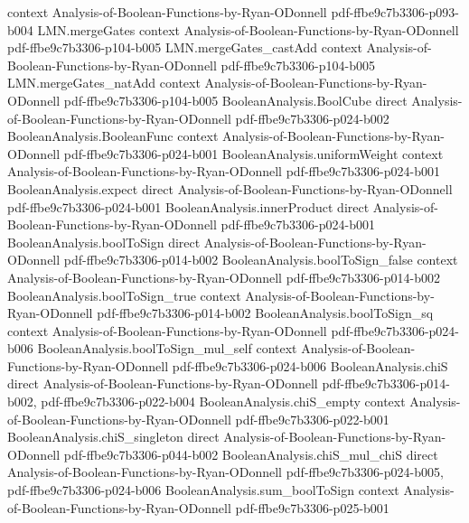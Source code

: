 \begin{lemma}
  {context}
  {Analysis-of-Boolean-Functions-by-Ryan-ODonnell}
  {pdf-ffbe9c7b3306-p093-b004}
\proofstep
  {LMN.mergeGates}
  {context}
  {Analysis-of-Boolean-Functions-by-Ryan-ODonnell}
  {pdf-ffbe9c7b3306-p104-b005}
\proofstep
  {LMN.mergeGates_castAdd}
  {context}
  {Analysis-of-Boolean-Functions-by-Ryan-ODonnell}
  {pdf-ffbe9c7b3306-p104-b005}
\proofstep
  {LMN.mergeGates_natAdd}
  {context}
  {Analysis-of-Boolean-Functions-by-Ryan-ODonnell}
  {pdf-ffbe9c7b3306-p104-b005}
\proofstep
  {BooleanAnalysis.BoolCube}
  {direct}
  {Analysis-of-Boolean-Functions-by-Ryan-ODonnell}
  {pdf-ffbe9c7b3306-p024-b002}
\proofstep
  {BooleanAnalysis.BooleanFunc}
  {context}
  {Analysis-of-Boolean-Functions-by-Ryan-ODonnell}
  {pdf-ffbe9c7b3306-p024-b001}
\proofstep
  {BooleanAnalysis.uniformWeight}
  {context}
  {Analysis-of-Boolean-Functions-by-Ryan-ODonnell}
  {pdf-ffbe9c7b3306-p024-b001}
\proofstep
  {BooleanAnalysis.expect}
  {direct}
  {Analysis-of-Boolean-Functions-by-Ryan-ODonnell}
  {pdf-ffbe9c7b3306-p024-b001}
\proofstep
  {BooleanAnalysis.innerProduct}
  {direct}
  {Analysis-of-Boolean-Functions-by-Ryan-ODonnell}
  {pdf-ffbe9c7b3306-p024-b001}
\proofstep
  {BooleanAnalysis.boolToSign}
  {direct}
  {Analysis-of-Boolean-Functions-by-Ryan-ODonnell}
  {pdf-ffbe9c7b3306-p014-b002}
\proofstep
  {BooleanAnalysis.boolToSign_false}
  {context}
  {Analysis-of-Boolean-Functions-by-Ryan-ODonnell}
  {pdf-ffbe9c7b3306-p014-b002}
\proofstep
  {BooleanAnalysis.boolToSign_true}
  {context}
  {Analysis-of-Boolean-Functions-by-Ryan-ODonnell}
  {pdf-ffbe9c7b3306-p014-b002}
\proofstep
  {BooleanAnalysis.boolToSign_sq}
  {context}
  {Analysis-of-Boolean-Functions-by-Ryan-ODonnell}
  {pdf-ffbe9c7b3306-p024-b006}
\proofstep
  {BooleanAnalysis.boolToSign_mul_self}
  {context}
  {Analysis-of-Boolean-Functions-by-Ryan-ODonnell}
  {pdf-ffbe9c7b3306-p024-b006}
\proofstep
  {BooleanAnalysis.chiS}
  {direct}
  {Analysis-of-Boolean-Functions-by-Ryan-ODonnell}
  {pdf-ffbe9c7b3306-p014-b002,
    pdf-ffbe9c7b3306-p022-b004}
\proofstep
  {BooleanAnalysis.chiS_empty}
  {context}
  {Analysis-of-Boolean-Functions-by-Ryan-ODonnell}
  {pdf-ffbe9c7b3306-p022-b001}
\proofstep
  {BooleanAnalysis.chiS_singleton}
  {direct}
  {Analysis-of-Boolean-Functions-by-Ryan-ODonnell}
  {pdf-ffbe9c7b3306-p044-b002}
\proofstep
  {BooleanAnalysis.chiS_mul_chiS}
  {direct}
  {Analysis-of-Boolean-Functions-by-Ryan-ODonnell}
  {pdf-ffbe9c7b3306-p024-b005,
    pdf-ffbe9c7b3306-p024-b006}
\proofstep
  {BooleanAnalysis.sum_boolToSign}
  {context}
  {Analysis-of-Boolean-Functions-by-Ryan-ODonnell}
  {pdf-ffbe9c7b3306-p025-b001}

\end{lemma}
